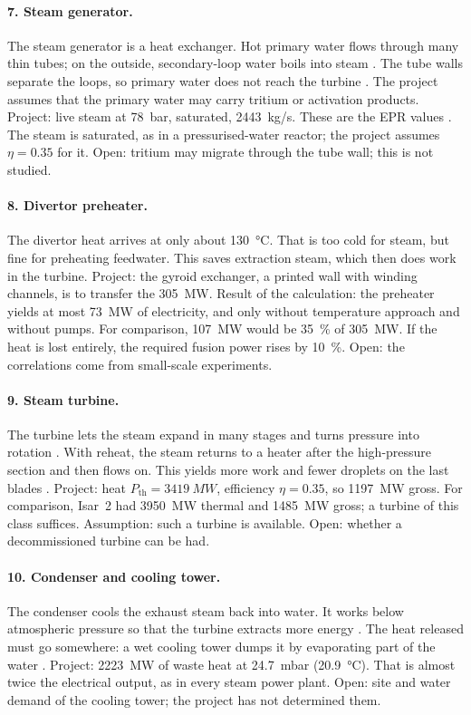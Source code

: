 \paragraph{7. Steam generator.} The steam generator is a heat exchanger. Hot primary water flows through many thin tubes; on the outside, secondary-loop water boils into steam \cite{bt_steamgen}. The tube walls separate the loops, so primary water does not reach the turbine \cite{bt_steamgen,bt_pwr}. The project assumes that the primary water may carry tritium or activation products. Project: live steam at \SI{78}{bar}, saturated, \SI{2443}{kg/s}. These are the EPR values \cite{epr_en}. The steam is saturated, as in a pressurised-water reactor; the project assumes $\eta = 0.35$ for it. Open: tritium may migrate through the tube wall; this is not studied.

\paragraph{8. Divertor preheater.} The divertor heat arrives at only about \SI{130}{\celsius}. That is too cold for steam, but fine for preheating feedwater. This saves extraction steam, which then does work in the turbine. Project: the gyroid exchanger, a printed wall with winding channels, is to transfer the \SI{305}{MW}. Result of the calculation: the preheater yields at most \SI{73}{MW} of electricity, and only without temperature approach and without pumps. For comparison, \SI{107}{MW} would be \SI{35}{\percent} of \SI{305}{MW}. If the heat is lost entirely, the required fusion power rises by \SI{10}{\percent}. Open: the correlations come from small-scale experiments.

\paragraph{9. Steam turbine.} The turbine lets the steam expand in many stages and turns pressure into rotation \cite{bt_turbine}. With reheat, the steam returns to a heater after the high-pressure section and then flows on. This yields more work and fewer droplets on the last blades \cite{bt_turbine}. Project: heat $P_\text{th} = \SI{3419}{MW}$, efficiency $\eta = 0.35$, so \SI{1197}{MW} gross. For comparison, Isar~2 had \SI{3950}{MW} thermal and \SI{1485}{MW} gross; a turbine of this class suffices. Assumption: such a turbine is available. Open: whether a decommissioned turbine can be had.

\paragraph{10. Condenser and cooling tower.} The condenser cools the exhaust steam back into water. It works below atmospheric pressure so that the turbine extracts more energy \cite{bt_condenser}. The heat released must go somewhere: a wet cooling tower dumps it by evaporating part of the water \cite{bt_cooling}. Project: \SI{2223}{MW} of waste heat at \SI{24.7}{mbar} (\SI{20.9}{\celsius}). That is almost twice the electrical output, as in every steam power plant. Open: site and water demand of the cooling tower; the project has not determined them.

